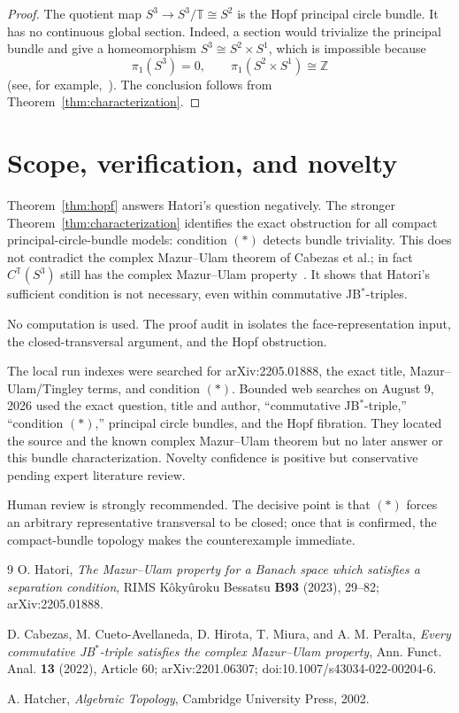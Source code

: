 \documentclass[11pt]{article}
\newcommand{\T}{\mathbb T}
\begin{document}
\begin{proof}
The quotient map $S^3\to S^3/\T\cong S^2$ is the Hopf principal circle
bundle.  It has no continuous global section.  Indeed, a section would
trivialize the principal bundle and give a homeomorphism
$S^3\cong S^2\times S^1$, which is impossible because
\[
 \pi_1(S^3)=0,
 \qquad
 \pi_1(S^2\times S^1)\cong\mathbb Z
\]
(see, for example,~\cite{Hatcher}).  The conclusion follows from
Theorem~\ref{thm:characterization}.
\end{proof}

\section{Scope, verification, and novelty}

Theorem~\ref{thm:hopf} answers Hatori's question negatively.  The stronger
Theorem~\ref{thm:characterization} identifies the exact obstruction for all
compact principal-circle-bundle models: condition $(*)$ detects bundle
triviality.  This does not contradict the complex Mazur--Ulam theorem of
Cabezas et al.; in fact $C^{\T}(S^3)$ still has the complex Mazur--Ulam
property~\cite[Theorem~3.1]{CabezasEtAl}.  It shows that Hatori's sufficient
condition is not necessary, even within commutative JB$^*$-triples.

No computation is used.  The proof audit in  isolates
the face-representation input, the closed-transversal argument, and the Hopf
obstruction.

The local run indexes were searched for arXiv:2205.01888, the exact title,
Mazur--Ulam/Tingley terms, and condition $(*)$.  Bounded web searches on
August 9, 2026 used the exact question, title and author, ``commutative
JB$^*$-triple,'' ``condition $(*)$,'' principal circle bundles, and the Hopf
fibration.  They located the source and the known complex Mazur--Ulam theorem
but no later answer or this bundle characterization.  Novelty confidence is
positive but conservative pending expert literature review.

Human review is strongly recommended.  The decisive point is that $(*)$
forces an arbitrary representative transversal to be closed; once that is
confirmed, the compact-bundle topology makes the counterexample immediate.

\begin{thebibliography}{9}
O. Hatori,
\emph{The Mazur--Ulam property for a Banach space which satisfies a
separation condition}, RIMS K\^oky\^uroku Bessatsu \textbf{B93} (2023),
29--82; arXiv:2205.01888.

D. Cabezas, M. Cueto-Avellaneda, D. Hirota, T. Miura, and A. M. Peralta,
\emph{Every commutative JB$^*$-triple satisfies the complex Mazur--Ulam
property}, Ann. Funct. Anal. \textbf{13} (2022), Article 60;
arXiv:2201.06307; doi:10.1007/s43034-022-00204-6.

A. Hatcher,
\emph{Algebraic Topology}, Cambridge University Press, 2002.
\end{thebibliography}
\end{document}
